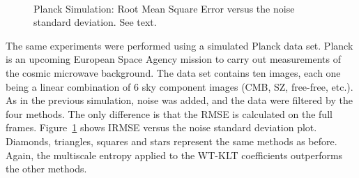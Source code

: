 \begin{figure}[htb]
\centerline{
\hbox{ 
}}
\caption{Planck Simulation: Root Mean Square Error versus the  noise standard deviation.
See text.}
\label{fig_planck_simu8_noi12}
\end{figure}

The same experiments were performed using a simulated Planck data set.
Planck is an upcoming European Space Agency mission to carry out measurements
of the cosmic microwave background.
The data set contains ten images, each one being a linear combination of
6 sky component images (CMB, SZ, free-free, etc.). As in the previous 
simulation, noise was added, and the data were filtered
by the four methods. The only difference is that the RMSE is calculated
on the full frames. Figure~\ref{fig_planck_simu8_noi12} shows 
IRMSE versus the noise standard deviation plot. Diamonds, triangles, 
squares and stars represent the same methods as before.
Again, the multiscale entropy applied to the WT-KLT coefficients outperforms 
the other methods.

